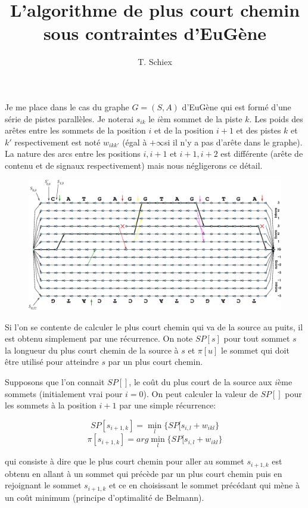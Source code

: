 \documentclass[a4paper]{article}
\title{L'algorithme de plus court chemin sous contraintes d'EuG\`ene}
\author{T. Schiex}
\begin{document}
\maketitle

Je me place dans le cas du graphe $G=(S,A)$ d'EuG\`ene qui est form\'e
d'une s\'erie de pistes parall\`eles. Je noterai $s_{ik}$ le $i$\`em sommet
de la piste $k$. Les poids des ar\^etes entre les sommets de la position
$i$ et de la position $i+1$ et des pistes $k$ et $k'$ respectivement
est not\'e $w_{ikk'}$ (\'egal \`a $+\infty$si il n'y a pas d'ar\^ete dans le
graphe). La nature des arcs entre les positions $i,i+1$ et $i+1,i+2$
est diff\'erente (ar\^ete de contenu et de signaux respectivement) mais
nous n\'egligerons ce d\'etail. 

\begin{figure}
\begin{center}
  \includegraphics[width=\textwidth]{graph}
\end{center}
\end{figure}

Si l'on se contente de calculer le plus court chemin qui va de la
source au puits, il est obtenu simplement par une r\'ecurrence. On note
$SP[s]$ pour tout sommet $s$ la longueur du plus court chemin de la
source \`a $s$ et $\pi[u]$ le sommet qui doit \^etre utilis\'e pour
atteindre $s$ par un plus court chemin.

Supposons que l'on connait $SP[]$, le co\^ut du plus court de la source
aux $i$\`eme sommets (initialement vrai pour $i=0$). On peut calculer la
valeur de $SP[]$ pour les sommets \`a la position $i+1$ par une simple
r\'ecurrence:

\[SP[s_{i+1,k}] = \min_l \{ SP[s_{i,l}+w_{ikl}\}\]
\[\pi[s_{i+1,k}] = arg\min_l \{ SP[s_{i,l}+w_{ikl}\}\]

qui consiste \`a dire que le plus court chemin pour aller au sommet
$s_{i+1,k}$ est obtenu en allant \`a un sommet qui pr\'ec\`ede par un plus
court chemin puis en rejoignant le sommet $s_{i+1,k}$ et ce en
choisissant le sommet pr\'ec\'edant qui m\`ene \`a un co\^ut minimum (principe
d'optimalit\'e de Belmann).
\end{document}
